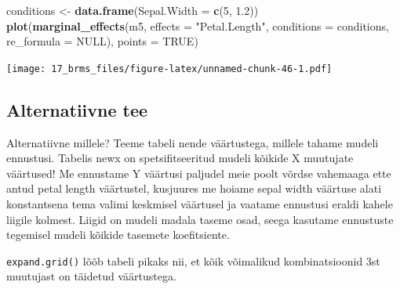 \documentclass[]{book}
\newenvironment{Shaded}{\begin{snugshade}}{\end{snugshade}}
\newcommand{\DataTypeTok}[1]{\textcolor[rgb]{0.13,0.29,0.53}{#1}}
\newcommand{\DecValTok}[1]{\textcolor[rgb]{0.00,0.00,0.81}{#1}}
\newcommand{\FloatTok}[1]{\textcolor[rgb]{0.00,0.00,0.81}{#1}}
\newcommand{\KeywordTok}[1]{\textcolor[rgb]{0.13,0.29,0.53}{\textbf{#1}}}
\newcommand{\NormalTok}[1]{#1}
\newcommand{\OperatorTok}[1]{\textcolor[rgb]{0.81,0.36,0.00}{\textbf{#1}}}
\newcommand{\OtherTok}[1]{\textcolor[rgb]{0.56,0.35,0.01}{#1}}
\newcommand{\StringTok}[1]{\textcolor[rgb]{0.31,0.60,0.02}{#1}}
\begin{document}
\begin{Shaded}
\begin{Highlighting}[]
\NormalTok{conditions <-}\StringTok{ }\KeywordTok{data.frame}\NormalTok{(}\DataTypeTok{Sepal.Width =} \KeywordTok{c}\NormalTok{(}\DecValTok{5}\NormalTok{, }\FloatTok{1.2}\NormalTok{))}
\KeywordTok{plot}\NormalTok{(}\KeywordTok{marginal_effects}\NormalTok{(m5, }\DataTypeTok{effects =} \StringTok{"Petal.Length"}\NormalTok{, }\DataTypeTok{conditions =}\NormalTok{ conditions, }\DataTypeTok{re_formula =} \OtherTok{NULL}\NormalTok{), }\DataTypeTok{points =} \OtherTok{TRUE}\NormalTok{)}
\end{Highlighting}
\end{Shaded}

\texttt{[image: 17\_brms\_files/figure-latex/unnamed-chunk-46-1.pdf]}

\hypertarget{alternatiivne-tee}{%
\subsection{Alternatiivne tee}\label{alternatiivne-tee}}

Alternatiivne millele?
Teeme tabeli nende väärtustega, millele tahame mudeli ennustusi. Tabelis newx on spetsifitseeritud mudeli kõikide X muutujate väärtused! Me ennustame Y väärtusi paljudel meie poolt võrdse vahemaaga ette antud petal length väärtustel, kusjuures me hoiame sepal width väärtuse alati konstantsena tema valimi keskmisel väärtusel ja vaatame ennustusi eraldi kahele liigile kolmest. Liigid on mudeli madala taseme osad, seega kasutame ennustuste tegemisel mudeli kõikide tasemete koefitsiente.

\begin{Shaded}
\end{Shaded}

\texttt{expand.grid()} lõõb tabeli pikaks nii, et kõik võimalikud kombinatsioonid 3st muutujast on täidetud väärtustega.
\end{document}
